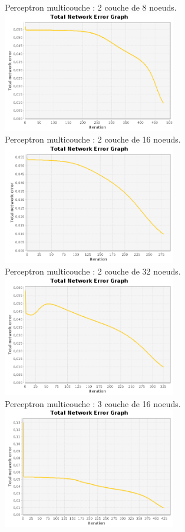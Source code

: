 \documentclass[10pt]{report}
\begin{document}
\begin{center}
Perceptron multicouche : 2 couche de 8 noeuds.\\
\includegraphics[height=200px]{img/SQUARE_8_8_21.png}\\
Perceptron multicouche : 2 couche de 16 noeuds.\\
\includegraphics[height=200px]{img/SQUARE_16_16_21.png}\\
Perceptron multicouche : 2 couche de 32 noeuds.\\
\includegraphics[height=200px]{img/SQUARE_32_32_21.png}\\
Perceptron multicouche : 3 couche de 16 noeuds.\\
\includegraphics[height=200px]{img/SQUARE_16_16_16_21.png}\\
\end{center}
\end{document}
